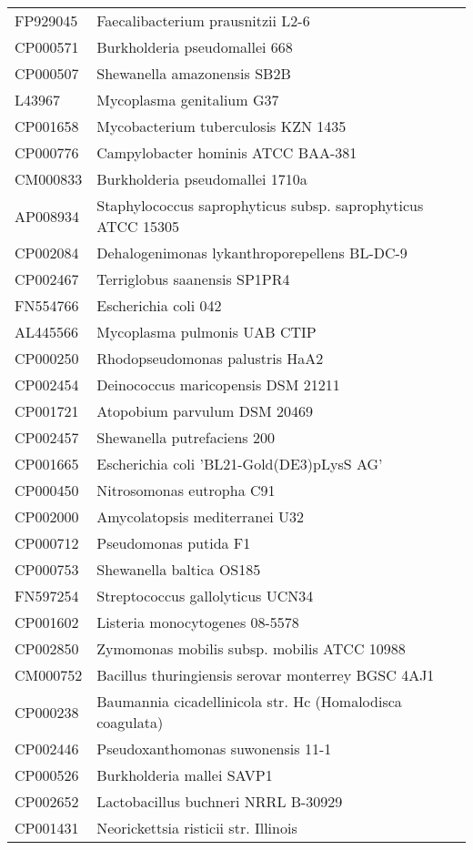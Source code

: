 \begin{longtable}{ll}
FP929045 & Faecalibacterium prausnitzii L2-6\\
CP000571 & Burkholderia pseudomallei 668\\
CP000507 & Shewanella amazonensis SB2B\\
L43967 & Mycoplasma genitalium G37\\
CP001658 & Mycobacterium tuberculosis KZN 1435\\
CP000776 & Campylobacter hominis ATCC BAA-381\\
CM000833 & Burkholderia pseudomallei 1710a\\
AP008934 & Staphylococcus saprophyticus subsp. saprophyticus ATCC 15305\\
CP002084 & Dehalogenimonas lykanthroporepellens BL-DC-9\\
CP002467 & Terriglobus saanensis SP1PR4\\
FN554766 & Escherichia coli 042\\
AL445566 & Mycoplasma pulmonis UAB CTIP\\
CP000250 & Rhodopseudomonas palustris HaA2\\
CP002454 & Deinococcus maricopensis DSM 21211\\
CP001721 & Atopobium parvulum DSM 20469\\
CP002457 & Shewanella putrefaciens 200\\
CP001665 & Escherichia coli 'BL21-Gold(DE3)pLysS AG'\\
CP000450 & Nitrosomonas eutropha C91\\
CP002000 & Amycolatopsis mediterranei U32\\
CP000712 & Pseudomonas putida F1\\
CP000753 & Shewanella baltica OS185\\
FN597254 & Streptococcus gallolyticus UCN34\\
CP001602 & Listeria monocytogenes 08-5578\\
CP002850 & Zymomonas mobilis subsp. mobilis ATCC 10988\\
CM000752 & Bacillus thuringiensis serovar monterrey BGSC 4AJ1\\
CP000238 & Baumannia cicadellinicola str. Hc (Homalodisca coagulata)\\
CP002446 & Pseudoxanthomonas suwonensis 11-1\\
CP000526 & Burkholderia mallei SAVP1\\
CP002652 & Lactobacillus buchneri NRRL B-30929\\
CP001431 & Neorickettsia risticii str. Illinois\\

\end{longtable}
